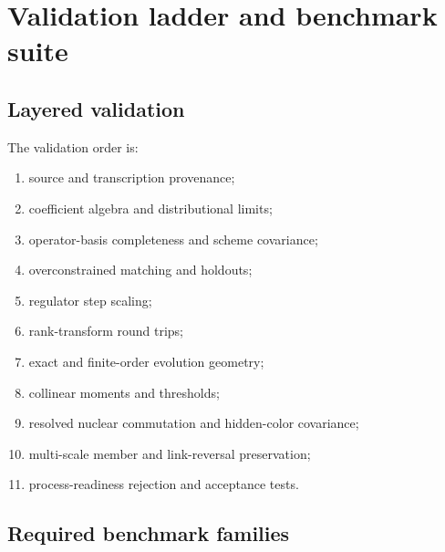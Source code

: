 \documentclass[11pt]{article}
\begin{document}
\section{Validation ladder and benchmark suite}
\label{sec:validation}

\subsection{Layered validation}

The validation order is:
\begin{enumerate}
\item source and transcription provenance;
\item coefficient algebra and distributional limits;
\item operator-basis completeness and scheme covariance;
\item overconstrained matching and holdouts;
\item regulator step scaling;
\item rank-transform round trips;
\item exact and finite-order evolution geometry;
\item collinear moments and thresholds;
\item resolved nuclear commutation and hidden-color covariance;
\item multi-scale member and link-reversal preservation;
\item process-readiness rejection and acceptance tests.
\end{enumerate}

\subsection{Required benchmark families}
\end{document}
